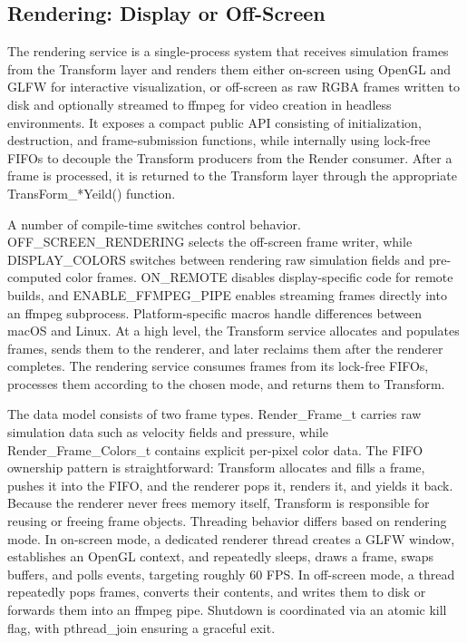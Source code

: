 \documentclass[12pt,a4paper]{article}
\begin{document}
\subsection{Rendering: Display or Off-Screen}

The rendering service is a single-process system that receives simulation frames from the Transform layer and renders them either on-screen using OpenGL and GLFW for interactive visualization, or off-screen as raw RGBA frames written to disk and optionally streamed to ffmpeg for video creation in headless environments. It exposes a compact public API consisting of initialization, destruction, and frame-submission functions, while internally using lock-free FIFOs to decouple the Transform producers from the Render consumer. After a frame is processed, it is returned to the Transform layer through the appropriate TransForm\_*Yeild() function.

A number of compile-time switches control behavior. OFF\_SCREEN\_RENDERING selects the off-screen frame writer, while DISPLAY\_COLORS switches between rendering raw simulation fields and pre-computed color frames. ON\_REMOTE disables display-specific code for remote builds, and ENABLE\_FFMPEG\_PIPE enables streaming frames directly into an ffmpeg subprocess. Platform-specific macros handle differences between macOS and Linux. At a high level, the Transform service allocates and populates frames, sends them to the renderer, and later reclaims them after the renderer completes. The rendering service consumes frames from its lock-free FIFOs, processes them according to the chosen mode, and returns them to Transform.

The data model consists of two frame types. Render\_Frame\_t carries raw simulation data such as velocity fields and pressure, while Render\_Frame\_Colors\_t contains explicit per-pixel color data. The FIFO ownership pattern is straightforward: Transform allocates and fills a frame, pushes it into the FIFO, and the renderer pops it, renders it, and yields it back. Because the renderer never frees memory itself, Transform is responsible for reusing or freeing frame objects. Threading behavior differs based on rendering mode. In on-screen mode, a dedicated renderer thread creates a GLFW window, establishes an OpenGL context, and repeatedly sleeps, draws a frame, swaps buffers, and polls events, targeting roughly 60 FPS. In off-screen mode, a thread repeatedly pops frames, converts their contents, and writes them to disk or forwards them into an ffmpeg pipe. Shutdown is coordinated via an atomic kill flag, with pthread\_join ensuring a graceful exit.
\end{document}
